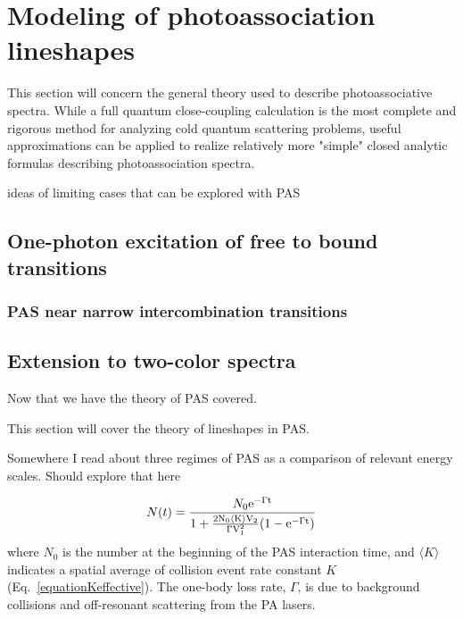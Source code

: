 \section{Modeling of photoassociation lineshapes} \label{sec:bohn_and_julienne}

This section will concern the general theory used to describe photoassociative spectra. While a full quantum close-coupling calculation is the most complete and rigorous method for analyzing cold quantum scattering problems, useful approximations can be applied to realize relatively more "simple" closed analytic formulas describing photoassociation spectra. 

ideas of limiting cases that can be explored with PAS \cite{Ciuryo2004}

\subsection{One-photon excitation of free to bound transitions} \label{ssec:one_color_pa}

\subsubsection{PAS near narrow intercombination transitions} \label{sssec:narrow_pa}

\subsection{Extension to two-color spectra} \label{ssec:two_color_pa}




Now that we have the theory of PAS covered. 

This section will cover the theory of lineshapes in PAS.

Somewhere I read about three regimes of PAS as a comparison of relevant energy scales. Should explore that here

\begin{equation}\label{eq:number}
   N(t)={N_0 \rm{e}^{-\Gamma t} \over 1+
   {2 N_0 \langle K \rangle V_2\over \Gamma V_1^2}(1-\rm{e}^{-\Gamma t})}
\end{equation}
where  $N_0$  is the number  at the beginning of the PAS interaction
time, and $\langle K \rangle$ indicates a spatial average of collision event rate constant $K$ (Eq.\ \ref{equationKeffective}). The one-body loss rate, $\Gamma$, is due to background
collisions and off-resonant scattering from the PA lasers.

